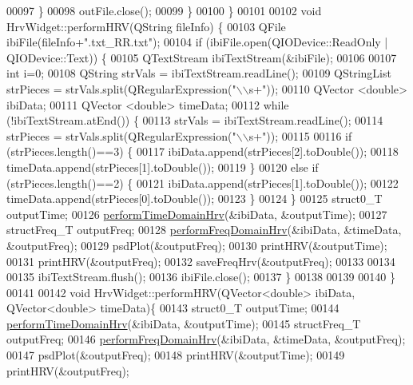 \begin{DoxyCode}
00097         \}
00098         outFile.close();
00099     \}
00100 \}
00101 
00102 \textcolor{keywordtype}{void} HrvWidget::performHRV(QString fileInfo) \{
00103     QFile ibiFile(fileInfo+\textcolor{stringliteral}{".txt\_RR.txt"});
00104     \textcolor{keywordflow}{if} (ibiFile.open(QIODevice::ReadOnly | QIODevice::Text)) \{
00105         QTextStream ibiTextStream(&ibiFile);
00106 
00107         \textcolor{keywordtype}{int} i=0;
00108         QString strVals = ibiTextStream.readLine();
00109         QStringList strPieces = strVals.split(QRegularExpression(\textcolor{stringliteral}{"\(\backslash\)\(\backslash\)s+"}));
00110         QVector <double> ibiData;
00111         QVector <double> timeData;
00112         \textcolor{keywordflow}{while} (!ibiTextStream.atEnd()) \{
00113             strVals = ibiTextStream.readLine();
00114             strPieces = strVals.split(QRegularExpression(\textcolor{stringliteral}{"\(\backslash\)\(\backslash\)s+"}));
00115 
00116             \textcolor{keywordflow}{if} (strPieces.length()==3) \{
00117                 ibiData.append(strPieces[2].toDouble());
00118                 timeData.append(strPieces[1].toDouble());
00119             \}
00120             \textcolor{keywordflow}{else} \textcolor{keywordflow}{if} (strPieces.length()==2) \{
00121                 ibiData.append(strPieces[1].toDouble());
00122                 timeData.append(strPieces[0].toDouble());
00123             \}
00124         \}
00125          struct0\_T outputTime;
00126          \hyperlink{group__HRV-Analysis_ga2bd6c358a622e01babb7fdbca313c50f}{performTimeDomainHrv}(&ibiData, &outputTime);
00127          structFreq\_T outputFreq;
00128          \hyperlink{group__HRV-Analysis_ga3cfec29967efe1561722a05d03f26158}{performFreqDomainHrv}(&ibiData, &timeData, &outputFreq);
00129          psdPlot(&outputFreq);
00130          printHRV(&outputTime);
00131          printHRV(&outputFreq);
00132          saveFreqHrv(&outputFreq);
00133 
00134 
00135         ibiTextStream.flush();
00136         ibiFile.close();
00137     \}
00138 
00139 
00140 \}
00141 
00142 \textcolor{keywordtype}{void} HrvWidget::performHRV(QVector<double> ibiData, QVector<double> timeData)\{
00143     struct0\_T outputTime;
00144     \hyperlink{group__HRV-Analysis_ga2bd6c358a622e01babb7fdbca313c50f}{performTimeDomainHrv}(&ibiData, &outputTime);
00145     structFreq\_T outputFreq;
00146     \hyperlink{group__HRV-Analysis_ga3cfec29967efe1561722a05d03f26158}{performFreqDomainHrv}(&ibiData, &timeData, &outputFreq);
00147     psdPlot(&outputFreq);
00148     printHRV(&outputTime);
00149     printHRV(&outputFreq);

\end{DoxyCode}
